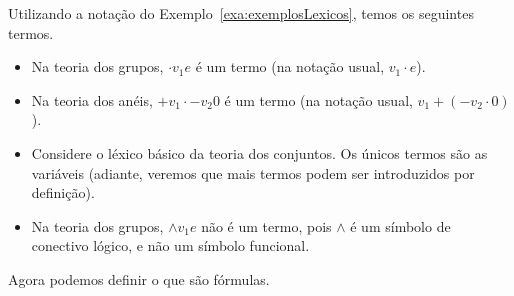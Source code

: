 \begin{example}\label{exa:termosPrimeiraOrdem}Utilizando a notação do Exemplo~\ref{exa:exemplosLexicos}, temos os seguintes termos.
    \begin{itemize}
        \item Na teoria dos grupos, $\cdot v_1 e$ é um termo (na notação usual, $v_1 \cdot e$).
        \item Na teoria dos anéis, ${+} v_1 {\cdot} {-}v_2 0$ é um termo (na notação usual, $v_1 + (-v_2 \cdot 0)$).
        \item Considere o léxico básico da teoria dos conjuntos.
        Os únicos termos são as variáveis (adiante, veremos que mais termos podem ser introduzidos por definição).
        \item Na teoria dos grupos, ${\wedge} v_1 e$ não é um termo, pois $\wedge$ é um símbolo de conectivo lógico, e não um símbolo funcional.
    \end{itemize}
\end{example}

Agora podemos definir o que são fórmulas.

